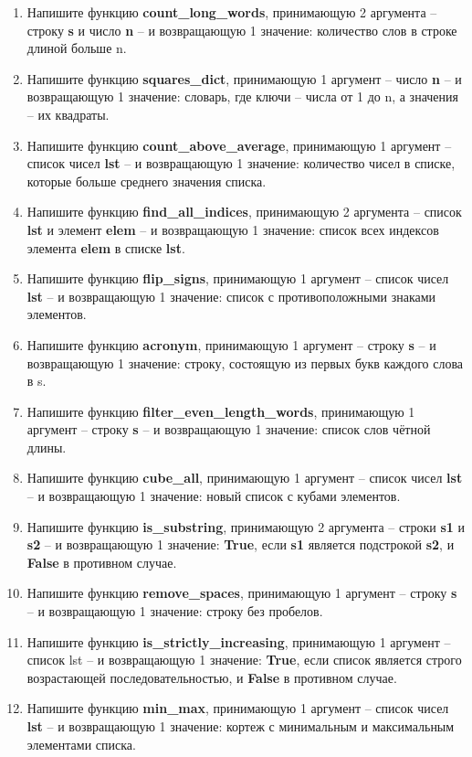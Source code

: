 \documentclass[a4,12pt]{article}
\theoremstyle{remark}
\begin{document}
\begin{enumerate}
    \item Напишите функцию \textbf{count\_long\_words}, принимающую 2 аргумента – строку \textbf{s} и число \textbf{n} – и возвращающую 1 значение: количество слов в строке длиной больше n.
    \item Напишите функцию \textbf{squares\_dict}, принимающую 1 аргумент – число \textbf{n} – и возвращающую 1 значение: словарь, где ключи – числа от 1 до n, а значения – их квадраты.
    \item Напишите функцию \textbf{count\_above\_average}, принимающую 1 аргумент – список чисел \textbf{lst} – и возвращающую 1 значение: количество чисел в списке, которые больше среднего значения списка.
    \item Напишите функцию \textbf{find\_all\_indices}, принимающую 2 аргумента – список \textbf{lst} и элемент \textbf{elem} – и возвращающую 1 значение: список всех индексов элемента \textbf{elem} в списке \textbf{lst}.
    \item Напишите функцию \textbf{flip\_signs}, принимающую 1 аргумент – список чисел \textbf{lst} – и возвращающую 1 значение: список с противоположными знаками элементов.
    \item Напишите функцию \textbf{acronym}, принимающую 1 аргумент – строку \textbf{s} – и возвращающую 1 значение: строку, состоящую из первых букв каждого слова в s.
    \item Напишите функцию \textbf{filter\_even\_length\_words}, принимающую 1 аргумент – строку \textbf{s} – и возвращающую 1 значение: список слов чётной длины.
    \item Напишите функцию \textbf{cube\_all}, принимающую 1 аргумент – список чисел \textbf{lst} – и возвращающую 1 значение: новый список с кубами элементов.
    \item Напишите функцию \textbf{is\_substring}, принимающую 2 аргумента – строки \textbf{s1} и \textbf{s2} – и возвращающую 1 значение: \textbf{True}, если \textbf{s1} является подстрокой \textbf{s2}, и \textbf{False} в противном случае.
    \item Напишите функцию \textbf{remove\_spaces}, принимающую 1 аргумент – строку \textbf{s} – и возвращающую 1 значение: строку без пробелов.
    \item Напишите функцию \textbf{is\_strictly\_increasing}, принимающую 1 аргумент – список lst – и возвращающую 1 значение: \textbf{True}, если список является строго возрастающей последовательностью, и \textbf{False} в противном случае.
    \item Напишите функцию \textbf{min\_max}, принимающую 1 аргумент – список чисел \textbf{lst} – и возвращающую 1 значение: кортеж с минимальным и максимальным элементами списка.

\end{enumerate}
\end{document}
